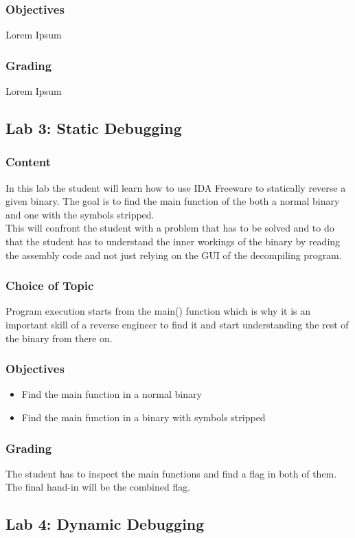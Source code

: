 \subsubsection*{Objectives}
Lorem Ipsum
\subsubsection*{Grading}
Lorem Ipsum


\subsection{Lab 3: Static Debugging}
\subsubsection*{Content}
In this lab the student will learn how to use IDA Freeware to statically reverse a given binary. The goal is to find the main function of the both a normal binary and one with the symbols stripped. \\
This will confront the student with a problem that has to be solved and to do that the student has to understand the inner workings of the binary by reading the assembly code and not just relying on the GUI of the decompiling program.
\subsubsection*{Choice of Topic}
Program execution starts from the main() function which is why it is an important skill of a reverse engineer to find it and start understanding the rest of the binary from there on.
\subsubsection*{Objectives}
\begin{itemize}
    \item Find the main function in a normal binary
    \item Find the main function in a binary with symbols stripped
\end{itemize}
\subsubsection*{Grading}
The student has to inspect the main functions and find a flag in both of them. The final hand-in will be the combined flag.


\subsection{Lab 4: Dynamic Debugging}
